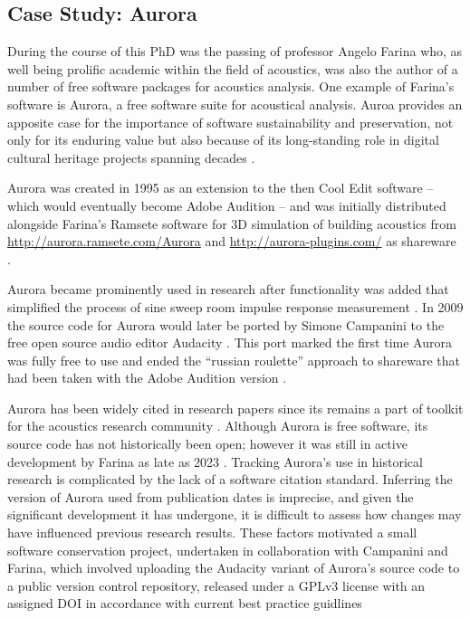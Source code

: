 \subsection{Case Study: Aurora}\label{sec:aurora}

During the course of this PhD was the passing of professor Angelo Farina who, as
well being prolific academic within the field of acoustics, was also the author
of a number of free software packages for acoustics analysis. One example of
Farina's software is Aurora, a free software suite for acoustical analysis.
Auroa provides an apposite case for the importance of software sustainability
and preservation, not only for its enduring value but also because of its
long-standing role in digital cultural heritage projects spanning decades
\cite{fausti_acoustic_2000,frey_acoustical_2013,almagropastor_assessing_2021}.

Aurora was created in 1995 \cite{farina_auralization_1995} as an extension to
the then Cool Edit software \cite{tronchin_acoustics_1997} -- which would
eventually become Adobe Audition \cite{farina_listening_2004} -- and was
initially distributed alongside Farina's Ramsete software for 3D simulation of
building acoustics \cite{farina_aurora_1995} from
\url{http://aurora.ramsete.com/Aurora} and \url{http://aurora-plugins.com/} as
shareware \cite{farina_registration_2007}. 

Aurora became prominently used in research after functionality was added that
simplified the process of sine sweep room impulse response measurement
\cite{farina_aurora_2000}. In 2009 the source code for Aurora would later be
ported by Simone Campanini to the free open source audio editor Audacity
\cite{farina_new_2009}. This port marked the first time Aurora was fully free to
use and ended the ``russian roulette'' approach to shareware that had been taken
with the Adobe Audition version \cite{farina_registration_2007}.

Aurora has been widely cited in research papers since its remains a part of
toolkit for the acoustics research community
\cite{fontana_highly_2024,popp_speech_2024,denti_pan_2024}. Although Aurora is
free software, its source code has not historically been open; however it was
still in active development by Farina as late as 2023
\cite{bevilacqua_new_2023}. Tracking Aurora’s use in historical research is
complicated by the lack of a software citation standard. Inferring the version
of Aurora used from publication dates is imprecise, and given the significant
development it has undergone, it is difficult to assess how changes may have
influenced previous research results. These factors motivated a small software
conservation project, undertaken in collaboration with Campanini and Farina,
which involved uploading the Audacity variant of Aurora’s source code to a
public version control repository, released under a GPLv3 license with an
assigned DOI \cite{farina_aurora_2025} in accordance with current best practice
guidlines \cite{stall_journal_2023, hong_how_2019}

